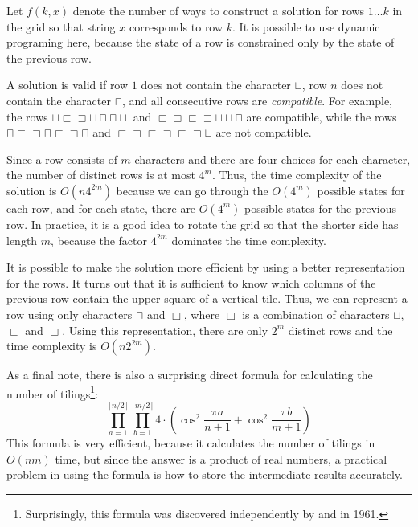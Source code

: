 Let $f(k,x)$ denote the number of ways to
construct a solution for rows $1 \ldots k$
in the grid so that string $x$ corresponds to row $k$.
It is possible to use dynamic programing here,
because the state of a row is constrained
only by the state of the previous row.

A solution is valid if row $1$ does not contain
the character $\sqcup$,
row $n$ does not contain the character $\sqcap$,
and all consecutive rows are \emph{compatible}.
For example, the rows
$\sqcup \sqsubset \sqsupset \sqcup \sqcap \sqcap \sqcup$ and
$\sqsubset \sqsupset \sqsubset \sqsupset \sqcup \sqcup \sqcap$ 
are compatible, while the rows
$\sqcap \sqsubset \sqsupset \sqcap \sqsubset \sqsupset \sqcap$ and
$\sqsubset \sqsupset \sqsubset \sqsupset \sqsubset \sqsupset \sqcup$
are not compatible.

Since a row consists of $m$ characters and there are
four choices for each character, the number of distinct
rows is at most $4^m$.
Thus, the time complexity of the solution is
$O(n 4^{2m})$ because we can go through the
$O(4^m)$ possible states for each row,
and for each state, there are $O(4^m)$
possible states for the previous row.
In practice, it is a good idea to rotate the grid
so that the shorter side has length $m$,
because the factor $4^{2m}$ dominates the time complexity.

It is possible to make the solution more efficient
by using a better representation for the rows.
It turns out that it is sufficient to know which
columns of the previous row contain the upper square
of a vertical tile.
Thus, we can represent a row using only characters
$\sqcap$ and $\Box$, where $\Box$ is a combination
of characters
$\sqcup$, $\sqsubset$ and $\sqsupset$.
Using this representation, there are only
$2^m$ distinct rows and the time complexity is
$O(n 2^{2m})$.

As a final note, there is also a surprising direct formula
for calculating the number of tilings\footnote{Surprisingly,
this formula was discovered independently
by \cite{kas61} and \cite{tem61} in 1961.}:
\[ \prod_{a=1}^{\lceil n/2 \rceil} \prod_{b=1}^{\lceil m/2 \rceil} 4 \cdot (\cos^2 \frac{\pi a}{n + 1} + \cos^2 \frac{\pi b}{m+1})\]
This formula is very efficient, because it calculates
the number of tilings in $O(nm)$ time,
but since the answer is a product of real numbers,
a practical problem in using the formula is
how to store the intermediate results accurately.


